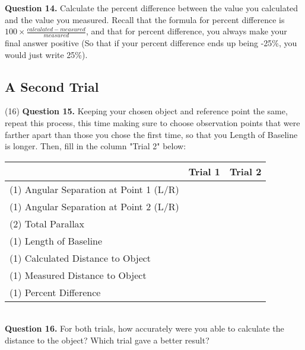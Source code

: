 \documentclass[11pt]{article}
\begin{document}
\textbf{Question 14.} Calculate the percent difference between the value you calculated and the value you measured. Recall that the formula for percent difference is $100\times\frac{calculated-measured}{measured}$, and that for percent difference, you always make your final answer positive (So that if your percent difference ends up being -25\%, you would just write 25\%).

\newpage

\subsection*{A Second Trial}

(16) \textbf{Question 15.} Keeping your chosen object and reference point the same, repeat this process, this time making sure to choose observation points that were farther apart than those you chose the first time, so that you Length of Baseline is longer. Then, fill in the column "Trial 2" below: \\

\begin{tabular}{| l | l | l |}
	\hline
	                               & Trial 1\hspace{4cm} & Trial 2\hspace{4cm}  \\ \hline
	(1) Angular Separation at Point 1 (L/R)  &                     &                      \\ \hline
	(1) Angular Separation at Point 2  (L/R) &                     &                      \\ \hline
	(2) Total Parallax                       &                     &                      \\ \hline
	(1) Length of Baseline                   &                     &                      \\ \hline
	(1) Calculated Distance to Object        &                     &                      \\ \hline
	(1) Measured Distance to Object          &                     &                      \\ \hline
	(1) Percent Difference                   &                     &                      \\
	\hline
\end{tabular}\\

\textbf{Question 16.} For both trials, how accurately were you able to calculate the distance to the object? Which trial gave a better result?\\
\end{document}
